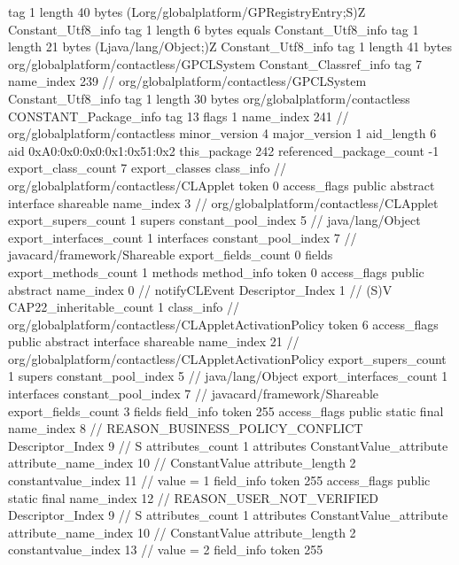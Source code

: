 {{{			tag	1
			length	40
			bytes	(Lorg/globalplatform/GPRegistryEntry;S)Z
		}
		Constant_Utf8_info {
			tag	1
			length	6
			bytes	equals
		}
		Constant_Utf8_info {
			tag	1
			length	21
			bytes	(Ljava/lang/Object;)Z
		}
		Constant_Utf8_info {
			tag	1
			length	41
			bytes	org/globalplatform/contactless/GPCLSystem
		}
		Constant_Classref_info {
			tag	7
			name_index	239		// org/globalplatform/contactless/GPCLSystem
		}
		Constant_Utf8_info {
			tag	1
			length	30
			bytes	org/globalplatform/contactless
		}
		CONSTANT_Package_info {
			tag	13
			flags	1
			name_index	241		// org/globalplatform/contactless
			minor_version	4
			major_version	1
			aid_length	6
			aid	0xA0:0x0:0x0:0x1:0x51:0x2
		}
	}
	this_package	242
	referenced_package_count	-1
	export_class_count	7
	export_classes {
		class_info {		// org/globalplatform/contactless/CLApplet
			token	0
			access_flags	public abstract interface shareable
			name_index	3		// org/globalplatform/contactless/CLApplet
			export_supers_count	1
			supers {
				constant_pool_index	5		// java/lang/Object
			}
			export_interfaces_count	1
			interfaces {
				constant_pool_index	7		// javacard/framework/Shareable
			}
			export_fields_count	0
			fields {
			}
			export_methods_count	1
			methods {
				method_info {
					token	0
					access_flags	public abstract
					name_index	0		// notifyCLEvent
					Descriptor_Index	1		// (S)V
				}
			}
			CAP22_inheritable_count	1
		}
		class_info {		// org/globalplatform/contactless/CLAppletActivationPolicy
			token	6
			access_flags	public abstract interface shareable
			name_index	21		// org/globalplatform/contactless/CLAppletActivationPolicy
			export_supers_count	1
			supers {
				constant_pool_index	5		// java/lang/Object
			}
			export_interfaces_count	1
			interfaces {
				constant_pool_index	7		// javacard/framework/Shareable
			}
			export_fields_count	3
			fields {
			field_info {
				token	255
				access_flags	public static final
				name_index	8		// REASON_BUSINESS_POLICY_CONFLICT
				Descriptor_Index	9		// S
				attributes_count	1
				attributes {
				ConstantValue_attribute {
					attribute_name_index	10		// ConstantValue
					attribute_length	2
					constantvalue_index	11		// value = 1
				}
				}
			}
			field_info {
				token	255
				access_flags	public static final
				name_index	12		// REASON_USER_NOT_VERIFIED
				Descriptor_Index	9		// S
				attributes_count	1
				attributes {
				ConstantValue_attribute {
					attribute_name_index	10		// ConstantValue
					attribute_length	2
					constantvalue_index	13		// value = 2
				}
				}
			}
			field_info {
				token	255
}}}}}
